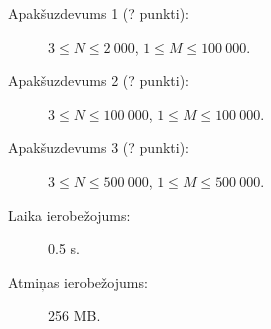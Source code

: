 \documentclass{boi2014-lv}
\begin{document}
    \Scoring

    \begin{description}
        \item[Apakšuzdevums 1 (? punkti):] $3 \le N \le 2\ 000$, $1 \le M \le 100\ 000$.
        \item[Apakšuzdevums 2 (? punkti):] $3 \le N \le 100\ 000$, $1 \le M \le 100\ 000$.
        \item[Apakšuzdevums 3 (? punkti):] $3 \le N \le 500\ 000$, $1 \le M \le 500\ 000$.
    \end{description}

    \Constraints

    \begin{description}
        \item[Laika ierobežojums:] 0.5 s.
        \item[Atmiņas ierobežojums:] 256 MB.
    \end{description}
\end{document}
